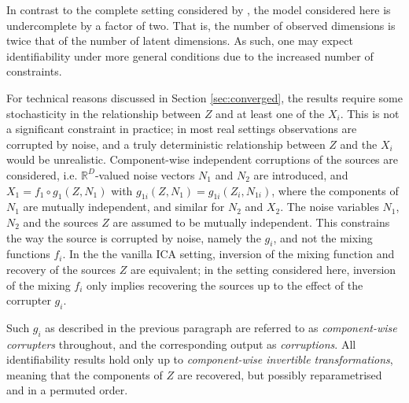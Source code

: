 In contrast to the complete setting considered by \cite{hyvarinen19a}, the model considered here is undercomplete by a factor of two. 
That is, the number of observed dimensions is twice that of the number of latent dimensions.
As such, one may expect identifiability under more general conditions due to the increased number of constraints.

For technical reasons discussed in Section
\ref{sec:converged}, the results require some stochasticity in the relationship between $Z$ and at least one of the $X_i$.
This is not a significant constraint in practice; in most real settings observations are corrupted by noise, and a truly deterministic relationship between $Z$ and the $X_i$ would be unrealistic.
Component-wise independent corruptions of the sources are considered, i.e. $\mathbb{R}^D$-valued noise vectors $N_1$ and $N_2$ are introduced, and $X_1 = f_1 \circ g_1(Z, N_1)$ with $g_{1i}(Z, N_1) = g_{1i}(Z_i, N_{1i})$, where the components of $N_{1}$ are mutually independent, and similar for $N_2$ and $X_2$. 
The noise variables $N_1$, $N_2$ and the sources $Z$ are assumed to be mutually independent.
This constrains the way the source is corrupted by noise, namely the $g_i$, and not the mixing functions $f_i$.
In the the vanilla ICA setting, inversion of the mixing function and recovery of the sources $Z$ are equivalent; in the setting considered here, inversion of the mixing $f_i$ only implies recovering the sources up to the effect of the corrupter $g_i$.

Such $g_i$ as described in the previous paragraph are referred to as \emph{component-wise corrupters} throughout, and the corresponding output as \emph{corruptions}. 
All identifiability results hold only up to \emph{component-wise invertible transformations}, meaning that the components of $Z$ are recovered, but possibly reparametrised and in a permuted order. 





